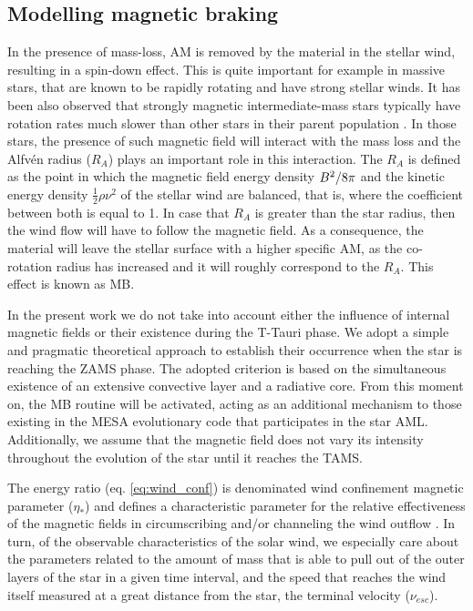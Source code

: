 \documentclass[fleqn,usenatbib]{mnras}
\begin{document}
\subsection{Modelling magnetic braking}
In the presence of mass-loss, AM is removed by the material in the stellar wind, resulting in a spin-down effect. This is quite important for example in massive stars, that are known to be rapidly rotating and have strong stellar winds. It has been also observed that strongly magnetic intermediate-mass stars typically have rotation rates much slower than other stars in their parent population \citep{Mathys2006}. In those stars, the presence of such magnetic field will interact with the mass loss and the Alfv\'{e}n radius ($R_{A}$) plays an important role in this interaction. The $R_{A}$ is defined as the point in which the magnetic field energy density $B^{2}/8\pi$ and the kinetic energy density $\frac{1}{2}\rho\nu^{2}$ of the stellar wind are balanced, that is, where the coefficient between both is equal to 1. In case that $R_{A}$ is greater than the star radius, then the wind flow will have to follow the magnetic field. As a consequence, the material will leave the stellar surface with a higher specific AM, as the co-rotation radius has increased and it will roughly correspond to the $R_{A}$. This effect is known as MB.\par

In the present work we do not take into account either the influence of internal magnetic fields or their existence during the T-Tauri phase. We adopt a simple and pragmatic theoretical approach to establish their occurrence when the star is reaching the ZAMS phase. The adopted criterion is based on the simultaneous existence of an extensive convective layer and a radiative core. From this moment on, the MB routine will be activated, acting as an additional mechanism to those existing in the MESA evolutionary code that participates in the star AML. Additionally, we assume that the magnetic field does not vary its intensity throughout the evolution of the star until it reaches the TAMS.\par

The energy ratio (eq. \ref{eq:wind_conf}) is denominated wind confinement magnetic parameter ($\eta_*$) and defines a characteristic parameter for the relative effectiveness of the magnetic fields in circumscribing and/or channeling the wind outflow \citep{UdDoula2002}. In turn, of the observable characteristics of the solar wind, we especially care about the parameters related to the amount of mass that is able to pull out of the outer layers of the star in a given time interval, and the speed that reaches the wind itself measured at a great distance from the star, the terminal velocity ($\nu_{esc}$).\par
\end{document}

